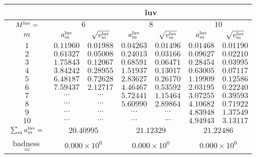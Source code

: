 \begin{tabular}{c|cc|cc|cc|}
&
\multicolumn{6}{|c|}{luv} \\
\hline
$M^{\mathrm{luv}}=$ &
 \multicolumn{2}{|c|}{$6$} &
 \multicolumn{2}{|c|}{$8$} &
 \multicolumn{2}{|c|}{$10$} \\
$m$ &
 $a^{\mathrm{luv}}_m$ & $\sqrt{v^{\mathrm{luv}}_m}$ &
 $a^{\mathrm{luv}}_m$ & $\sqrt{v^{\mathrm{luv}}_m}$ &
 $a^{\mathrm{luv}}_m$ & $\sqrt{v^{\mathrm{luv}}_m}$ \\
$1$ &
 $0.11960$ & $0.01988$ &
 $0.04263$ & $0.01496$ &
 $0.01468$ & $0.01190$ \\
$2$ &
 $0.61327$ & $0.05008$ &
 $0.24013$ & $0.03166$ &
 $0.09627$ & $0.02210$ \\
$3$ &
 $1.75843$ & $0.12067$ &
 $0.68591$ & $0.06471$ &
 $0.28454$ & $0.03995$ \\
$4$ &
 $3.84242$ & $0.28955$ &
 $1.51937$ & $0.13017$ &
 $0.63005$ & $0.07117$ \\
$5$ &
 $6.48187$ & $0.72628$ &
 $2.83627$ & $0.26170$ &
 $1.19909$ & $0.12586$ \\
$6$ &
 $7.59437$ & $2.12717$ &
 $4.46467$ & $0.53592$ &
 $2.03195$ & $0.22240$ \\
$7$ &
 $\cdots$ & $\cdots$ &
 $5.72441$ & $1.15464$ &
 $3.07255$ & $0.39593$ \\
$8$ &
 $\cdots$ & $\cdots$ &
 $5.60990$ & $2.89864$ &
 $4.10682$ & $0.71922$ \\
$9$ &
 $\cdots$ & $\cdots$ &
 $\cdots$ & $\cdots$ &
 $4.83948$ & $1.37549$ \\
$10$ &
 $\cdots$ & $\cdots$ &
 $\cdots$ & $\cdots$ &
 $4.94943$ & $3.13117$ \\
\hline
$\sum_m a^{\mathrm{luv}}_m=$ &
 \multicolumn{2}{|c|}{$20.40995$} &
 \multicolumn{2}{|c|}{$21.12329$} &
 \multicolumn{2}{|c|}{$21.22486$} \\
badness\,$=$ &
 \multicolumn{2}{|c|}{$0.000\times 10^{0}$} &
 \multicolumn{2}{|c|}{$0.000\times 10^{0}$} &
 \multicolumn{2}{|c|}{$0.000\times 10^{0}$} \\
\end{tabular}
